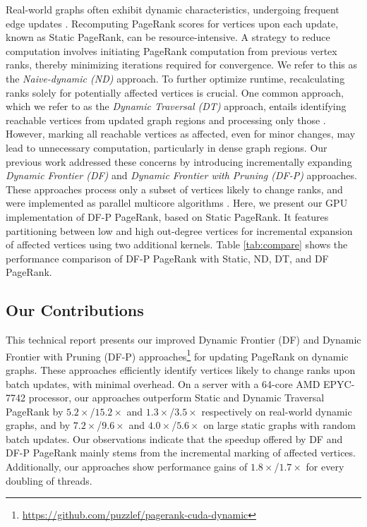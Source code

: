 Real-world graphs often exhibit dynamic characteristics, undergoing frequent edge updates \cite{agarwal2012real, barros2021survey}. Recomputing PageRank scores for vertices upon each update, known as Static PageRank, can be resource-intensive. A strategy to reduce computation involves initiating PageRank computation from previous vertex ranks, thereby minimizing iterations required for convergence. We refer to this as the \textit{Naive-dynamic (ND)} approach. To further optimize runtime, recalculating ranks solely for potentially affected vertices is crucial. One common approach, which we refer to as the \textit{Dynamic Traversal (DT)} approach, entails identifying reachable vertices from updated graph regions and processing only those \cite{rank-desikan05, kim2015incremental, rank-giri20, sahu2022dynamic}. However, marking all reachable vertices as affected, even for minor changes, may lead to unnecessary computation, particularly in dense graph regions. Our previous work \cite{sahu2024df} addressed these concerns by introducing incrementally expanding \textit{Dynamic Frontier (DF)} and \textit{Dynamic Frontier with Pruning (DF-P)} approaches. These approaches process only a subset of vertices likely to change ranks, and were implemented as parallel multicore algorithms \cite{sahu2024df}. Here, we present our GPU implementation of DF-P PageRank, based on Static PageRank. It features partitioning between low and high out-degree vertices for incremental expansion of affected vertices using two additional kernels. Table \ref{tab:compare} shows the performance comparison of DF-P PageRank with Static, ND, DT, and DF PageRank.




\subsection{Our Contributions}

This technical report presents our improved Dynamic Frontier (DF) and Dynamic Frontier with Pruning (DF-P) approaches\footnote{\url{https://github.com/puzzlef/pagerank-cuda-dynamic}} for updating PageRank on dynamic graphs. These approaches efficiently identify vertices likely to change ranks upon batch updates, with minimal overhead. On a server with a 64-core AMD EPYC-7742 processor, our approaches outperform Static and Dynamic Traversal PageRank by $5.2\times$/$15.2\times$ and $1.3\times$/$3.5\times$ respectively on real-world dynamic graphs, and by $7.2\times$/$9.6\times$ and $4.0\times$/$5.6\times$ on large static graphs with random batch updates. Our observations indicate that the speedup offered by DF and DF-P PageRank mainly stems from the incremental marking of affected vertices. Additionally, our approaches show performance gains of $1.8\times$/$1.7\times$ for every doubling of threads.

